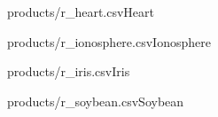 \documentclass[]{article}
\begin{document}
\begin{table}[!ht]
    \parbox{.45\linewidth}{
	    \begin{ride}{products/r_heart.csv}{Heart}\end{ride}
	}
	\hfill
    \parbox{.45\linewidth}{
	    \begin{ride}{products/r_ionosphere.csv}{Ionosphere}\end{ride}
	}
\end{table}

\begin{table}[!ht]
    \parbox{.45\linewidth}{
	    \begin{ride}{products/r_iris.csv}{Iris}\end{ride}
	}
	\hfill
    \parbox{.45\linewidth}{
	    \begin{ride}{products/r_soybean.csv}{Soybean}\end{ride}
	}
\end{table}
\end{document}
